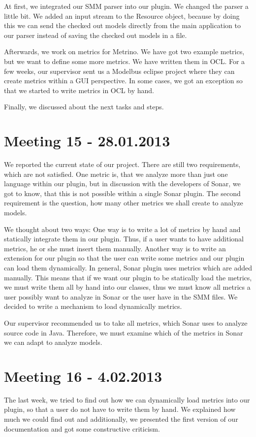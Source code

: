 At first, we integrated our SMM parser into our plugin. We changed the parser a little bit. We added an input stream to the Resource object, because by doing this we can send the checked out models directly from the main application to our parser instead of saving the checked out models in a file.

Afterwards, we work on metrics for Metrino. We have got two example metrics, but we want to define some more metrics. We have written them in OCL. For a few weeks, our supervisor sent us a Modelbus eclipse project where they can create metrics within a GUI perspective. In some cases, we got an exception so that we started to write metrics in OCL by hand.

Finally, we discussed about the next tasks and steps.

\section{Meeting 15 - 28.01.2013}
We reported the current state of our project. There are still two requirements, which are not satisfied. One metric is, that we analyze more than just one language within our plugin, but in discussion with the developers of Sonar, we got to know, that this is not possible within a single Sonar plugin. The second requirement is the question, how many other metrics we shall create to analyze models.

We thought about two ways: One way is to write a lot of metrics by hand and statically integrate them in our plugin. Thus, if a user wants to have additional metrics, he or she must insert them manually. Another way is to write an extension for our plugin so that the user can write some metrics and our plugin can load them dynamically. In general, Sonar plugin uses metrics which are added manually. This means that if we want our plugin to be statically load the metrics, we must write them all by hand into our classes, thus we must know all metrics a user possibly want to analyze in Sonar or the user have in the SMM files. We decided to write a mechanism to load dynamically metrics.

Our supervisor recommended us to take all metrics, which Sonar uses to analyze source code in Java. Therefore, we must examine which of the metrics in Sonar we can adapt to analyze models.

\section{Meeting 16 - 4.02.2013}
The last week, we tried to find out how we can dynamically load metrics into our plugin, so that a user do not have to write them by hand. We explained how much we could find out and additionally, we presented the first version of our documentation and got some constructive criticism. 

